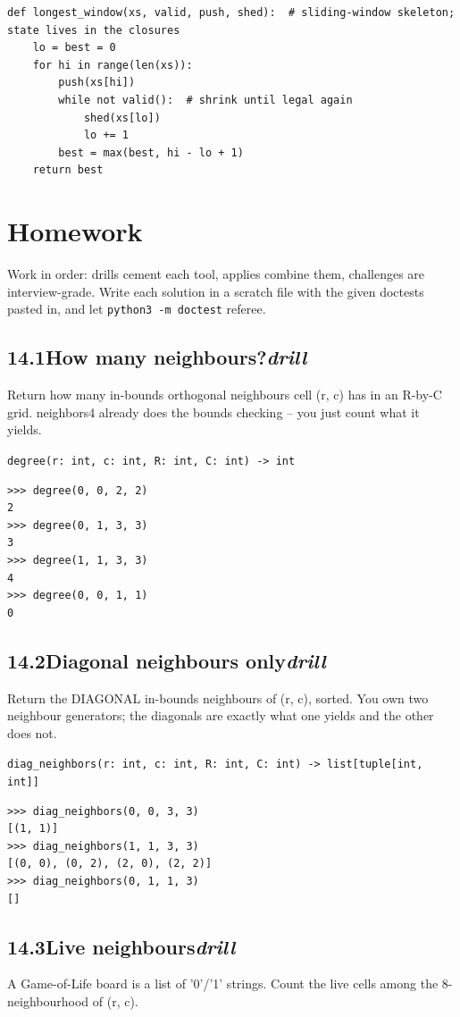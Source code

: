 \documentclass[10pt,letterpaper]{book}
\begin{document}
\begin{lstlisting}[style=ex]
def longest_window(xs, valid, push, shed):  # sliding-window skeleton; state lives in the closures
    lo = best = 0
    for hi in range(len(xs)):
        push(xs[hi])
        while not valid():  # shrink until legal again
            shed(xs[lo])
            lo += 1
        best = max(best, hi - lo + 1)
    return best
\end{lstlisting}

\section{Homework}
Work in order: drills cement each tool, applies combine them,
challenges are interview-grade. Write each solution in a scratch file with
the given doctests pasted in, and let \texttt{python3 -m doctest} referee.
\subsection*{14.1\quad How many neighbours?\hfill\textnormal{\textit{drill}}}
Return how many in-bounds orthogonal neighbours cell (r, c) has in an R-by-C grid. neighbors4 already does the bounds checking -- you just count what it yields.

\noindent\texttt{degree(r: int, c: int, R: int, C: int) -> int}
\begin{lstlisting}[style=ex]
>>> degree(0, 0, 2, 2)
2
>>> degree(0, 1, 3, 3)
3
>>> degree(1, 1, 3, 3)
4
>>> degree(0, 0, 1, 1)
0
\end{lstlisting}
\subsection*{14.2\quad Diagonal neighbours only\hfill\textnormal{\textit{drill}}}
Return the DIAGONAL in-bounds neighbours of (r, c), sorted. You own two neighbour generators; the diagonals are exactly what one yields and the other does not.

\noindent\texttt{diag\_neighbors(r: int, c: int, R: int, C: int) -> list[tuple[int, int]]}
\begin{lstlisting}[style=ex]
>>> diag_neighbors(0, 0, 3, 3)
[(1, 1)]
>>> diag_neighbors(1, 1, 3, 3)
[(0, 0), (0, 2), (2, 0), (2, 2)]
>>> diag_neighbors(0, 1, 1, 3)
[]
\end{lstlisting}
\subsection*{14.3\quad Live neighbours\hfill\textnormal{\textit{drill}}}
A Game-of-Life board is a list of '0'/'1' strings. Count the live cells among the 8-neighbourhood of (r, c).
\end{document}
